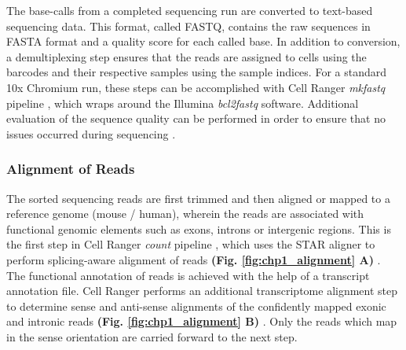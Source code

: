The base-calls from a completed sequencing run are converted to text-based sequencing data. This format, called FASTQ, contains the raw sequences in FASTA format and a quality score for each called base. In addition to conversion, a demultiplexing step ensures that the reads are assigned to cells using the barcodes and their respective samples using the sample indices. For a standard 10x Chromium run, these steps can be accomplished with Cell Ranger \textit{mkfastq} pipeline \textbf{\cite{noauthor_generating_nodate}}, which wraps around the Illumina \textit{bcl2fastq} software. Additional evaluation of the sequence quality can be performed in order to ensure that no issues occurred during sequencing \textbf{\cite{andrews_fastqc_2012}}.



\subsubsection{Alignment of Reads}


The sorted sequencing reads are first trimmed and then aligned or mapped to a reference genome (mouse / human), wherein the reads are associated with functional genomic elements such as exons, introns or intergenic regions. This is the first step in Cell Ranger \textit{count} pipeline \textbf{\cite{noauthor_running_nodate}}, which uses the STAR aligner to perform splicing-aware alignment of reads \textbf{(Fig. \ref{fig:chp1_alignment} A)} \textbf{\cite{dobin_star_2013}}. The functional annotation of reads is achieved with the help of a transcript annotation file. Cell Ranger performs an additional transcriptome alignment step to determine sense and anti-sense alignments of the confidently mapped exonic and intronic reads \textbf{(Fig. \ref{fig:chp1_alignment} B)} \textbf{\cite{noauthor_cell_nodate}}. Only the reads which map in the sense orientation are carried forward to the next step.\\

